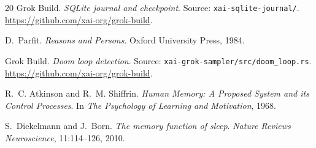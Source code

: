 \documentclass{article}
\begin{document}
\begin{thebibliography}{20}
Grok Build. \emph{SQLite journal and checkpoint}. Source: \texttt{xai-sqlite-journal/}. \url{https://github.com/xai-org/grok-build}.

D.~Parfit. \emph{Reasons and Persons}. Oxford University Press, 1984.

Grok Build. \emph{Doom loop detection}. Source: \texttt{xai-grok-sampler/src/doom\_loop.rs}. \url{https://github.com/xai-org/grok-build}.

R.~C. Atkinson and R.~M. Shiffrin. \emph{Human Memory: A Proposed System and its Control Processes}. In \emph{The Psychology of Learning and Motivation}, 1968.

S.~Diekelmann and J.~Born. \emph{The memory function of sleep}. \emph{Nature Reviews Neuroscience}, 11:114--126, 2010.

\end{thebibliography}
\end{document}
